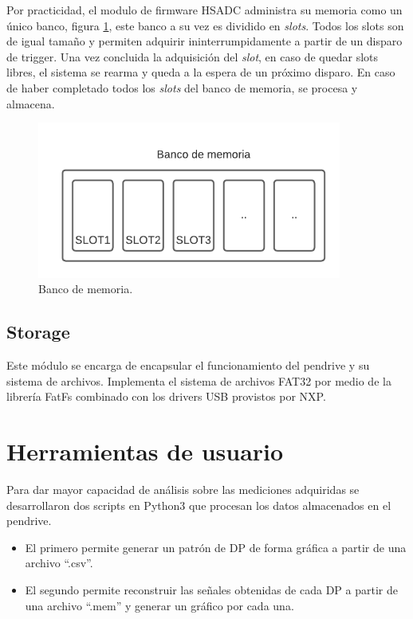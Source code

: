 Por practicidad, el modulo de firmware HSADC administra su memoria como un único banco, figura \ref{fig:firmBanco}, este banco a su vez es dividido en \textit{slots}. Todos los slots son de igual tamaño y permiten adquirir ininterrumpidamente a partir de un disparo de trigger. Una vez concluida la adquisición del \textit{slot},  en caso de quedar slots libres, el sistema se rearma y queda a la espera de un próximo disparo. En caso de haber completado todos los \textit{slots} del banco de memoria, se procesa y almacena.

\begin{figure}[ht]
	\centering
	\includegraphics[width=100mm]{./Figures/firmBanco.png}
	\caption{Banco de memoria.}
	\label{fig:firmBanco}
\end{figure}

\newpage

\subsection{Storage}

Este módulo se encarga de encapsular el funcionamiento del pendrive y su sistema de archivos. Implementa el sistema de archivos FAT32 por medio de la librería FatFs \citep{chanWeb:1} combinado con los drivers USB provistos por NXP.


\section{Herramientas de usuario}

Para dar mayor capacidad de análisis sobre las mediciones adquiridas se desarrollaron dos scripts en Python3 que procesan los datos almacenados en el pendrive. 
\begin{itemize}
\item El primero permite generar un patrón de DP de forma gráfica a partir de una archivo \enquote{.csv}.
\item El segundo permite reconstruir las señales obtenidas de cada DP a partir de una archivo \enquote{.mem} y generar un gráfico por cada una.
\end{itemize}  

